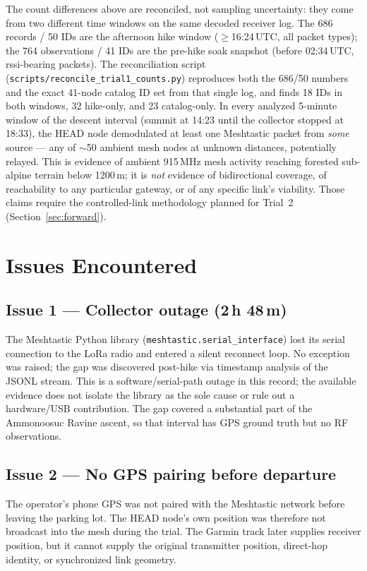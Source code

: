 \documentclass[11pt,letterpaper]{article}
\begin{document}
The count differences above are reconciled, not sampling uncertainty: they come from
two different time windows on the same decoded receiver log. The 686 records / 50 IDs
are the afternoon hike window ($\geq$16:24\,UTC, all packet types); the 764
observations / 41 IDs are the pre-hike soak snapshot (before 02:34\,UTC, rssi-bearing
packets). The reconciliation script (\texttt{scripts/reconcile\_trial1\_counts.py})
reproduces both the 686/50 numbers and the exact 41-node catalog ID set from that single
log, and finds 18 IDs in both windows, 32 hike-only, and 23 catalog-only. In every analyzed 5-minute window of the descent interval (summit at 14:23 until the
collector stopped at 18:33), the HEAD node demodulated at least one Meshtastic packet from
\emph{some} source --- any of $\sim$50 ambient mesh nodes at unknown
distances, potentially relayed. This is evidence of ambient 915\,MHz mesh activity reaching
forested sub-alpine terrain below 1200\,m; it is \emph{not} evidence of bidirectional
coverage, of reachability to any particular gateway, or of any specific link's viability.
Those claims require the controlled-link methodology planned for Trial~2
(Section~\ref{sec:forward}).

\section{Issues Encountered}

\subsection*{Issue 1 --- Collector outage (2\,h 48\,m)}
The Meshtastic Python library (\texttt{meshtastic.serial\_interface}) lost its serial connection
to the LoRa radio and entered a silent reconnect loop. No exception was raised; the gap
was discovered post-hike via timestamp analysis of the JSONL stream. This is a
software/serial-path outage in this record; the available evidence does not isolate the
library as the sole cause or rule out a hardware/USB contribution. The gap covered a
substantial part of the Ammonoosuc Ravine ascent, so that interval has GPS ground truth
but no RF observations.

\subsection*{Issue 2 --- No GPS pairing before departure}
The operator's phone GPS was not paired with the Meshtastic network before leaving the
parking lot. The HEAD node's own position was therefore not broadcast into the mesh
during the trial. The Garmin track later supplies receiver position, but it cannot supply
the original transmitter position, direct-hop identity, or synchronized link geometry.
\end{document}
